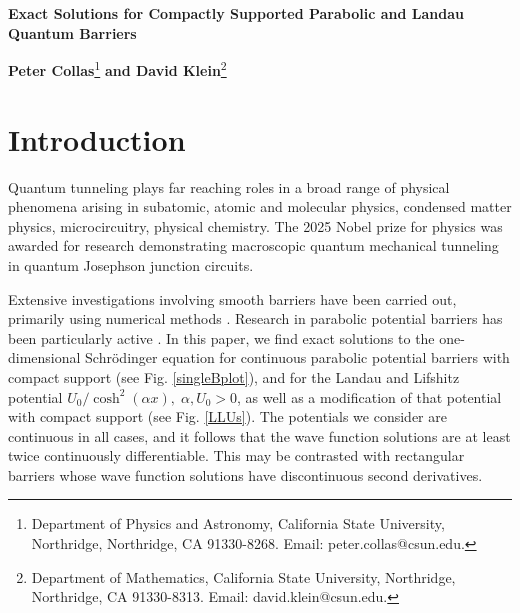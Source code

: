 \documentclass{article}
\numberwithin{equation}{section}
\begin{document}
\vspace{0.5 cm}

\begin{center}
\textbf{\large Exact Solutions for Compactly Supported Parabolic and Landau Quantum Barriers}
\vspace{6mm}
\end{center}

\noindent \textbf{\normalsize Peter Collas}\footnote{Department of Physics and Astronomy, California
State University, Northridge, Northridge, CA 91330-8268. Email: peter.collas@csun.edu.}
\textbf{\normalsize and David Klein}\footnote{Department of Mathematics, California State University,
Northridge, Northridge, CA 91330-8313. Email: david.klein@csun.edu.}\\

\vspace{.2cm}
\parbox{11cm}{} 
\vspace{.2cm}


\section{Introduction}\label{Intro}

Quantum tunneling plays far reaching roles in a broad range of physical phenomena arising in subatomic, atomic and molecular physics, condensed matter physics, microcircuitry, physical chemistry.  The 2025 Nobel prize for physics was awarded for research demonstrating macroscopic quantum mechanical tunneling in quantum Josephson junction circuits. \cite{DMC85,MDC85,MDC20}

Extensive investigations involving smooth barriers have been carried out, primarily using numerical methods \cite{DK10,MSSY14,H14,IL15,XH16}.  Research in parabolic potential barriers has been particularly active \cite{ST81,CH88,AGI95,HSADV13,LXLM20,Y24}.  In this paper, we find exact solutions to the one-dimensional Schr\"odinger equation for continuous parabolic potential barriers with compact support (see Fig. \ref{singleBplot}), and for the Landau and Lifshitz potential $U_0/\cosh^2 (\alpha x),\;\alpha, U_0 > 0$, as well as a modification of that potential with compact support (see Fig. \ref{LLUs}).  The potentials we consider are continuous in all cases, and it follows that the wave function solutions are at least twice continuously differentiable. This may be contrasted with rectangular barriers whose wave function solutions have discontinuous second derivatives.
\end{document}
